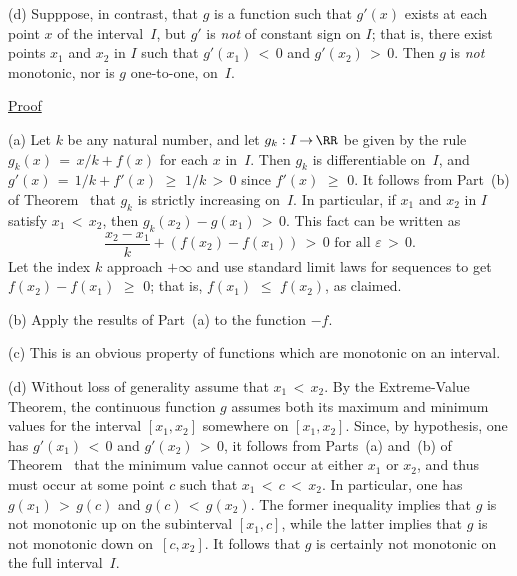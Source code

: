 \V

        (d) Supppose, in contrast, that $g$ is a function such that $g'(x)$ exists at each point $x$ of the interval~$I$,
    but $g'$ is {\em not} of constant sign on $I$; that is, there exist points $x_{1}$ and $x_{2}$ in $I$ such that $g'(x_{1})\,<\,0$ and $g'(x_{2})\,>\,0$.
    Then $g$ is {\em not} monotonic, nor is $g$ one-to-one, on~$I$.

\V

        \underline{Proof}

\V

        (a) Let $k$ be any natural number, and let $g_{k}:I \,{\rightarrow}\, {\RR}$ be given by the rule $g_{k}(x) \,=\, x/k + f(x)$ for each $x$ in~$I$. 
    Then $g_{k}$ is differentiable on~$I$, and $g'(x) \,=\, 1/k+f'(x)\,\,{\geq}\,\,1/k\,>\,0$ since $f'(x)\,\,{\geq}\,\,0$.
    It follows from Part~(b) of Theorem~ that $g_{k}$ is strictly increasing on~$I$.
    In particular, if $x_{1}$ and $x_{2}$ in $I$ satisfy $x_{1}\,<\,x_{2}$, then $g_{k}(x_{2})-g(x_{1})\,>\,0$. This fact can be written as
        \begin{displaymath}
        \frac{x_{2} - x_{1}}{k} + (f(x_{2})-f(x_{1}))\,>\,0 \mbox{ for all 
${\varepsilon}\,>\,0$}.
        \end{displaymath}
    Let the index $k$ approach $+{\infty}$ and use standard limit laws for sequences to get $f(x_{2})-f(x_{1})\,\,{\geq}\,\,0$;
    that is, $f(x_{1})\,\,{\leq}\,\,f(x_{2})$, as claimed.
    

\V

        (b) Apply the results of Part~(a) to the function $-f$.

\V

        (c) This is an obvious property of functions which are monotonic on an interval.

\V

        (d) Without loss of generality assume that $x_{1}\,<\,x_{2}$. By the Extreme-Value Theorem,
    the continuous function $g$ assumes both its maximum and minimum values for the interval $[x_{1},x_{2}]$ somewhere on $[x_{1}, x_{2}]$.
    Since, by hypothesis, one has $g'(x_{1})\,<\,0$ and $g'(x_{2})\,>\,0$, it follows from Parts~(a) and~(b) of Theorem~
    that the minimum value cannot occur at either $x_{1}$ or $x_{2}$, and thus must occur at some point $c$ such that $x_{1}\,<\,c\,<\,x_{2}$.
    In particular, one has $g(x_{1})\,>\,g(c)$ and $g(c)\,<\,g(x_{2})$. The former inequality implies that $g$
    is not monotonic up on the subinterval $[x_{1},c]$, while the latter implies that $g$ is not monotonic down on~$[c,x_{2}]$.
    It follows that $g$ is certainly not monotonic on the full interval~$I$.

